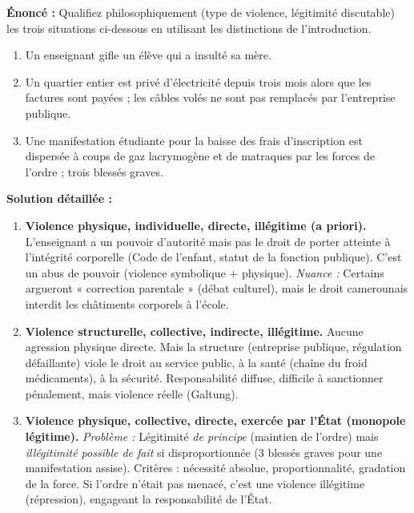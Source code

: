 \documentclass[11pt]{article}
\begin{document}
\begin{exoresolu}
\textbf{Énoncé :} Qualifiez philosophiquement (type de violence, légitimité discutable) les trois situations ci-dessous en utilisant les distinctions de l'introduction.
\begin{enumerate}
    \item Un enseignant gifle un élève qui a insulté sa mère.
    \item Un quartier entier est privé d'électricité depuis trois mois alors que les factures sont payées ; les câbles volés ne sont pas remplacés par l'entreprise publique.
    \item Une manifestation étudiante pour la baisse des frais d'inscription est dispersée à coups de gaz lacrymogène et de matraques par les forces de l'ordre ; trois blessés graves.
\end{enumerate}
\tcblower
\textbf{Solution détaillée :}
\begin{enumerate}
    \item \textbf{Violence physique, individuelle, directe, illégitime (a priori).} L'enseignant a un pouvoir d'autorité mais pas le droit de porter atteinte à l'intégrité corporelle (Code de l'enfant, statut de la fonction publique). C'est un abus de pouvoir (violence symbolique + physique). \emph{Nuance :} Certains argueront « correction parentale » (débat culturel), mais le droit camerounais interdit les châtiments corporels à l'école.
    \item \textbf{Violence structurelle, collective, indirecte, illégitime.} Aucune agression physique directe. Mais la structure (entreprise publique, régulation défaillante) viole le droit au service public, à la santé (chaîne du froid médicaments), à la sécurité. Responsabilité diffuse, difficile à sanctionner pénalement, mais violence réelle (Galtung).
    \item \textbf{Violence physique, collective, directe, exercée par l'État (monopole légitime).} \emph{Problème :} Légitimité \emph{de principe} (maintien de l'ordre) mais \emph{illégitimité possible de fait} si disproportionnée (3 blessés graves pour une manifestation assise). Critères : nécessité absolue, proportionnalité, gradation de la force. Si l'ordre n'était pas menacé, c'est une violence illégitime (répression), engageant la responsabilité de l'État.
\end{enumerate}
\end{exoresolu}
\end{document}
